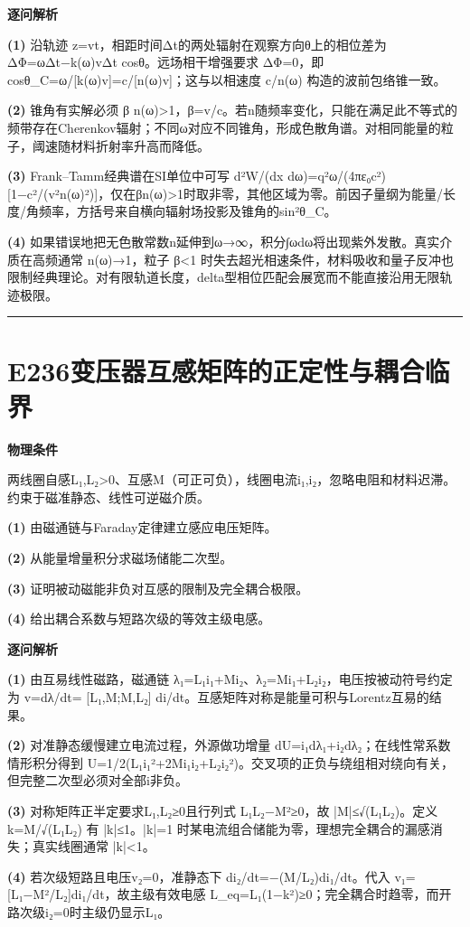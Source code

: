 \documentclass[UTF8,a4paper,11pt,oneside,openany]{ctexbook}
\begin{document}
\par\medskip\noindent\textbf{逐问解析}
\par\noindent\textbf{(1)} 沿轨迹 z=vt，相距时间Δt的两处辐射在观察方向θ上的相位差为 ΔΦ=ωΔt−k(ω)vΔt cosθ。远场相干增强要求 ΔΦ=0，即 cosθ\_C=ω/[k(ω)v]=c/[n(ω)v]；这与以相速度 c/n(ω) 构造的波前包络锥一致。
\par\noindent\textbf{(2)} 锥角有实解必须 β n(ω)>1，β=v/c。若n随频率变化，只能在满足此不等式的频带存在Cherenkov辐射；不同ω对应不同锥角，形成色散角谱。对相同能量的粒子，阈速随材料折射率升高而降低。
\par\noindent\textbf{(3)} Frank–Tamm经典谱在SI单位中可写 d²W/(dx dω)=q²ω/(4πε₀c²)[1−c²/(v²n(ω)²)]，仅在βn(ω)>1时取非零，其他区域为零。前因子量纲为能量/长度/角频率，方括号来自横向辐射场投影及锥角的sin²θ\_C。
\par\noindent\textbf{(4)} 如果错误地把无色散常数n延伸到ω→∞，积分∫ωdω将出现紫外发散。真实介质在高频通常 n(ω)→1，粒子 β<1 时失去超光相速条件，材料吸收和量子反冲也限制经典理论。对有限轨道长度，delta型相位匹配会展宽而不能直接沿用无限轨迹极限。

\par\bigskip\hrule\bigskip
\section*{E236\quad 变压器互感矩阵的正定性与耦合临界}
\textbf{物理条件}\par 两线圈自感L₁,L₂>0、互感M（可正可负），线圈电流i₁,i₂，忽略电阻和材料迟滞。约束于磁准静态、线性可逆磁介质。
\par\noindent\textbf{(1)} 由磁通链与Faraday定律建立感应电压矩阵。
\par\noindent\textbf{(2)} 从能量增量积分求磁场储能二次型。
\par\noindent\textbf{(3)} 证明被动磁能非负对互感的限制及完全耦合极限。
\par\noindent\textbf{(4)} 给出耦合系数与短路次级的等效主级电感。

\par\medskip\noindent\textbf{逐问解析}
\par\noindent\textbf{(1)} 由互易线性磁路，磁通链 λ₁=L₁i₁+Mi₂、λ₂=Mi₁+L₂i₂，电压按被动符号约定为 v=dλ/dt= [L₁,M;M,L₂] di/dt。互感矩阵对称是能量可积与Lorentz互易的结果。
\par\noindent\textbf{(2)} 对准静态缓慢建立电流过程，外源做功增量 dU=i₁dλ₁+i₂dλ₂；在线性常系数情形积分得到 U=1/2(L₁i₁²+2Mi₁i₂+L₂i₂²)。交叉项的正负与绕组相对绕向有关，但完整二次型必须对全部i非负。
\par\noindent\textbf{(3)} 对称矩阵正半定要求L₁,L₂≥0且行列式 L₁L₂−M²≥0，故 |M|≤√(L₁L₂)。定义 k=M/√(L₁L₂) 有 |k|≤1。|k|=1 时某电流组合储能为零，理想完全耦合的漏感消失；真实线圈通常 |k|<1。
\par\noindent\textbf{(4)} 若次级短路且电压v₂=0，准静态下 di₂/dt=−(M/L₂)di₁/dt。代入 v₁=[L₁−M²/L₂]di₁/dt，故主级有效电感 L\_eq=L₁(1−k²)≥0；完全耦合时趋零，而开路次级i₂=0时主级仍显示L₁。
\end{document}
